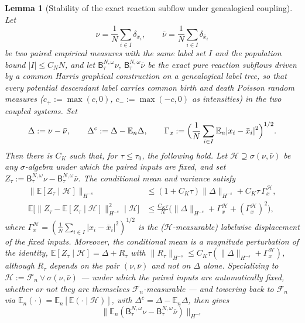 \documentclass[a4paper,fleqn]{cas-sc}
\newtheorem{lemma}[theorem]{Lemma}
\theoremstyle{definition}
\theoremstyle{remark}
\begin{document}
\begin{lemma}[Stability of the exact reaction subflow under genealogical coupling]\label{lem:Bstab}
Let
\[
\nu=\frac1N\sum_{i\in I}\delta_{x_i},
\qquad
\bar\nu=\frac1N\sum_{i\in I}\delta_{\bar x_i}
\]
be two paired empirical measures with the same label set $I$ and the population
bound $|I|\le C_NN$, and let $\mathsf B^{N,\omega}_\tau\nu$,
$\mathsf B^{N,\omega}_\tau\bar\nu$ be the exact pure reaction subflows driven by a
common Harris graphical construction on a genealogical label tree, so that every
potential descendant label carries common birth and death Poisson random measures
($c_+:=\max(c,0)$, $c_-:=\max(-c,0)$ as intensities) in the two coupled systems.
Set
\[
\Delta:=\nu-\bar\nu,\qquad
\Delta^c:=\Delta-\mathbb E_n\Delta,
\qquad
\Gamma_x:=\Bigl(\frac1N\sum_{i\in I}\mathbb E_n|x_i-\bar x_i|^2\Bigr)^{1/2}.
\]
Then there is $C_K$ such that, for $\tau\le\tau_0$, the following hold. Let
$\mathcal H\supseteq\sigma(\nu,\bar\nu)$ be any $\sigma$-algebra under which the
paired inputs are fixed, and set $Z_\tau:=\mathsf B^{N,\omega}_\tau\nu
-\mathsf B^{N,\omega}_\tau\bar\nu$. The conditional mean and variance satisfy
\begin{align}
\bigl\|\mathbb E[Z_\tau\mid\mathcal H]\bigr\|_{H^{-s}}
&\le (1+C_K\tau)\|\Delta\|_{H^{-s}}+C_K\tau\,\Gamma_x^{\mathcal H},
\label{eq:Bstab-cond-mean}\\
\mathbb E\bigl[\|Z_\tau-\mathbb E[Z_\tau\mid\mathcal H]\|_{H^{-s}}^2\mid\mathcal H\bigr]
&\le\frac{C_K\tau}{N}\bigl(\|\Delta\|_{H^{-s}}+\Gamma_x^{\mathcal H}+(\Gamma_x^{\mathcal H})^2\bigr),
\label{eq:Bstab-cond-var}
\end{align}
where $\Gamma_x^{\mathcal H}=(\frac1N\sum_{i\in I}|x_i-\bar x_i|^2)^{1/2}$ is the
($\mathcal H$-measurable) labelwise displacement of the fixed inputs. Moreover, the
conditional mean is a magnitude perturbation of the identity,
$\mathbb E[Z_\tau\mid\mathcal H]=\Delta+R_\tau$ with
$\|R_\tau\|_{H^{-s}}\le C_K\tau(\|\Delta\|_{H^{-s}}+\Gamma_x^{\mathcal H})$, although
$R_\tau$ depends on the pair $(\nu,\bar\nu)$ and not on $\Delta$ alone. Specializing to
$\mathcal H:=\mathcal F_n\vee\sigma(\nu,\bar\nu)$ --- under which the paired inputs are
automatically fixed, whether or not they are themselves $\mathcal F_n$-measurable ---
and towering back to $\mathcal F_n$ via
$\mathbb E_n(\cdot)=\mathbb E_n[\mathbb E(\cdot\mid\mathcal H)]$, with
$\Delta^c=\Delta-\mathbb E_n\Delta$, then gives
\begin{equation}\label{eq:Bstab-mean}
\bigl\|\mathbb E_n(\mathsf B^{N,\omega}_\tau\nu-\mathsf B^{N,\omega}_\tau\bar\nu)\bigr\|_{H^{-s}}

\end{equation}
\end{lemma}
\end{document}
